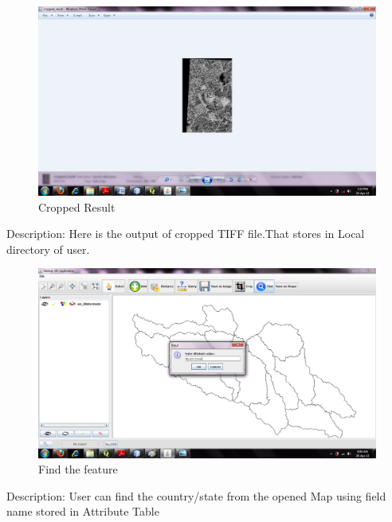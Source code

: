 \begin{figure}[h]
\begin{center}
  \includegraphics[scale=0.43] {15.jpg}
  \caption[Screenshot - Output Image]{Cropped Result}
\end{center}
\end{figure}
Description: Here is the output of  cropped TIFF file.That stores in Local directory of user.

\newpage
\begin{figure}[h]
\begin{center}
  \includegraphics[scale=0.43] {16.jpg}
  \caption[Screenshot - Find]{Find the feature}
\end{center}
\end{figure}
Description: User can find the country/state from the opened Map using field name  stored in Attribute Table

